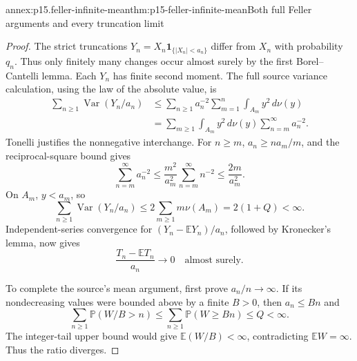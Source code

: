 \begin{annexitem}{annex:p15.feller-infinite-mean}{thm:p15-feller-infinite-mean}{Both full Feller arguments and every truncation limit}
\begin{proof}
The strict truncations \(Y_n=X_n\mathbf1_{\{|X_n|<a_n\}}\)
differ from \(X_n\) with probability \(q_n\). Thus only finitely
many changes occur almost surely by the first Borel--Cantelli lemma.
Each \(Y_n\) has finite second moment. The full source variance
calculation, using the law of the absolute value, is
\[
 \begin{aligned}
 \sum_{n\geq1}\operatorname{Var}(Y_n/a_n)
 &\leq\sum_{n\geq1}a_n^{-2}
                   \sum_{m=1}^n\int_{A_m}y^2\,d\nu(y)\\
 &=\sum_{m\geq1}\int_{A_m}y^2\,d\nu(y)
                              \sum_{n=m}^\infty a_n^{-2}.
 \end{aligned}
\]
Tonelli justifies the nonnegative interchange. For \(n\geq m\),
\(a_n\geq n a_m/m\), and the reciprocal-square bound gives
\[
 \sum_{n=m}^\infty a_n^{-2}
   \leq\frac{m^2}{a_m^2}\sum_{n=m}^\infty n^{-2}
   \leq\frac{2m}{a_m^2}.
\]
On \(A_m\), \(y<a_m\), so
\[
 \sum_{n\geq1}\operatorname{Var}(Y_n/a_n)
          \leq2\sum_{m\geq1}m\nu(A_m)=2(1+Q)<\infty.
\]
Independent-series convergence for \((Y_n-\mathbb EY_n)/a_n\),
followed by Kronecker's lemma, now gives
\[
 \frac{T_n-\mathbb ET_n}{a_n}\longrightarrow0
                                      \quad\text{almost surely}.
\]

To complete the source's mean argument, first prove \(a_n/n\to\infty\).
If its nondecreasing values were bounded above by a finite \(B>0\),
then \(a_n\leq Bn\) and
\[
 \sum_{n\geq1}\mathbb P(W/B>n)
   \leq\sum_{n\geq1}\mathbb P(W\geq Bn)
   \leq Q<\infty.
\]
The integer-tail upper bound would give \(\mathbb E(W/B)<\infty\),
contradicting \(\mathbb EW=\infty\). Thus the ratio diverges.


\end{proof}
\end{annexitem}
